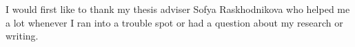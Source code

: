 I would first like to thank my thesis adviser Sofya Raskhodnikova who helped me a lot whenever I ran into a trouble spot or had a question about my research or writing. 

